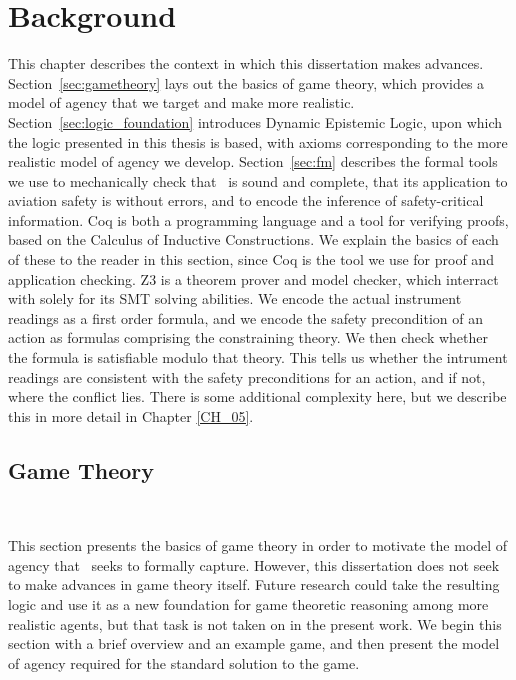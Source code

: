 \chapter{Background}
	\label{CH_02}

This chapter describes the context in which this dissertation makes advances. Section~\ref{sec:gametheory} lays out the basics of game theory, which provides a model of agency that we target and make more realistic. Section~\ref{sec:logic_foundation} introduces Dynamic Epistemic Logic, upon which the logic presented in this thesis is based, with axioms corresponding to the more realistic model of agency we develop. Section~\ref{sec:fm} describes the formal tools we use to mechanically check that \DASL\ is sound and complete, that its application to aviation safety is without errors, and to encode the inference of safety-critical information. Coq is both a programming language and a tool for verifying proofs, based on the Calculus of Inductive Constructions. We explain the basics of each of these to the reader in this section, since Coq is the tool we use for proof and application checking. Z3 is a theorem prover and model checker, which interract with solely for its SMT solving abilities. We encode the actual instrument readings as a first order formula, and we encode the safety precondition of an action as formulas comprising the constraining theory. We then check whether the formula is satisfiable modulo that theory. This tells us whether the intrument readings are consistent with the safety preconditions for an action, and if not, where the conflict lies. There is some additional complexity here, but we describe this in more detail in Chapter \ref{CH_05}.




\section{Game Theory}~\label{sec:gametheory}

This section presents the basics of game theory in order to motivate the model of agency that \DASL\ seeks to formally capture. However, this dissertation does not seek to make advances in game theory itself. Future research could take the resulting logic and use it as a new foundation for game theoretic reasoning among more realistic agents, but that task is not taken on in the present work. We begin this section with a brief overview and an example game, and then present the model of agency required for the standard solution to the game.

